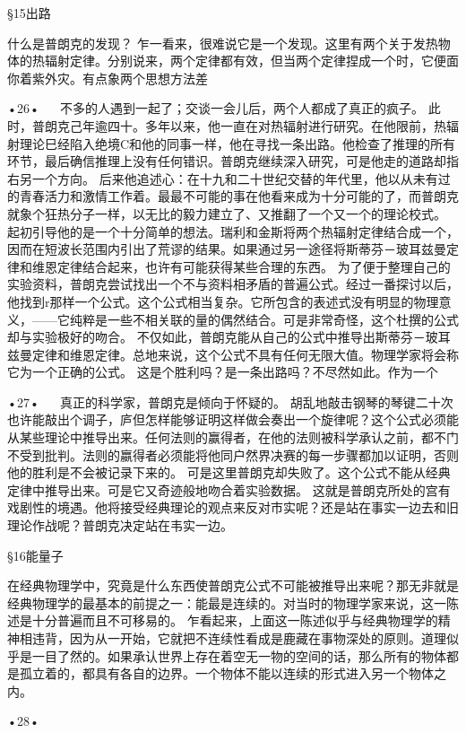 §15出路

什么是普朗克的发现？
乍一看来，很难说它是一个发现。这里有两个关于发热物体的热辐射定律。分别说来，两个定律都有效，但当两个定律捏成一个时，它便面你着紫外灾。有点象两个思想方法差

•26•
  
不多的人遇到一起了；交谈一会儿后，两个人都成了真正的疯子。
此时，普朗克己年逾四十。多年以来，他一直在对热辐射进行研究。在他限前，热辐射理论巳经陷入绝境C和他的同事一样，他在寻找一条出路。他检查了推理的所有环节，最后确信推理上没有任何错识。普朗克继续深入研究，可是他走的道路却指右另一个方向。
后来他追述心：在十九和二十世纪交替的年代里，他以从未有过的青春活力和激情工作着。最最不可能的事在他看来成为十分可能的了，而普朗克就象个狂热分子一样，以无比的毅力建立了、又推翻了一个又一个的理论校式。
起初引导他的是一个十分简单的想法。瑞利和金斯将两个热辐射定律结合成一个，因而在短波长范围内引出了荒谬的结果。如果通过另一途径将斯蒂芬－玻耳兹曼定律和维恩定律结合起来，也许有可能获得某些合理的东西。
为了便于整理自己的实验资料，普朗克尝试找出一个不与资料相矛盾的普遍公式。经过一番探讨以后，他找到r那样一个公式。这个公式相当复杂。它所包含的表述式没有明显的物理意义，——它纯粹是一些不相关联的量的偶然结合。可是非常奇怪，这个杜撰的公式却与实验极好的吻合。
不仅如此，普朗克能从自己的公式中推导出斯蒂芬－玻耳兹曼定律和维恩定律。总地来说，这个公式不具有任何无限大值。物理学家将会称它为一个正确的公式。
这是个胜利吗？是一条出路吗？不尽然如此。作为一个

•27•
  
真正的科学家，普朗克是倾向于怀疑的。
胡乱地敲击钢琴的琴键二十次也许能敲出个调子，庐但怎样能够证明这样做会奏出一个旋律呢？这个公式必须能从某些理论中推导出来。任何法则的赢得者，在他的法则被科学承认之前，都不门不受到批判。法则的嬴得者必须能将他同户然界决赛的每一步骤都加以证明，否则他的胜利是不会被记录下来的。
可是这里普朗克却失败了。这个公式不能从经典定律中推导出来。可是它又奇迹般地吻合着实验数据。
这就是普朗克所处的宫有戏剧性的境遇。他将接受经典理论的观点来反对市实呢？还是站在事实一边去和旧理论作战呢？普朗克决定站在韦实一边。

§16能量子

在经典物理学中，究竟是什么东西使普朗克公式不可能被推导出来呢？那无非就是经典物理学的最基本的前提之一：能最是连续的。对当时的物理学家来说，这一陈述是十分普遍而且不可移易的。
乍看起来，上面这一陈述似乎与经典物理学的精神相违背，因为从一开始，它就把不连续性看成是鹿藏在事物深处的原则。道理似乎是一目了然的。如果承认世界上存在着空无一物的空间的话，那么所有的物体都是孤立着的，都具有各自的边界。一个物体不能以连续的形式进入另一个物体之内。

•28•
 

